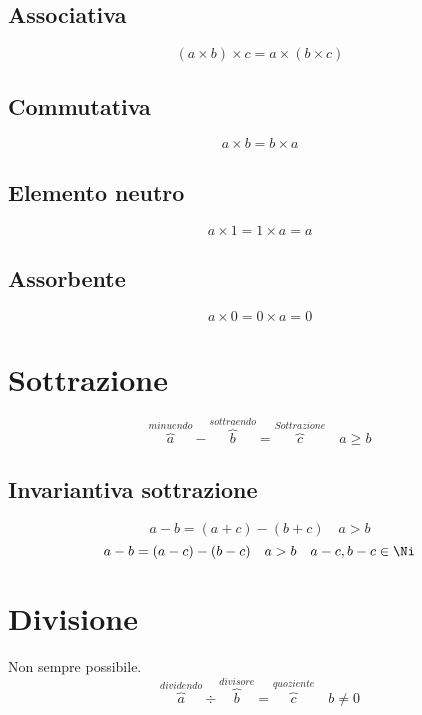 \subsection{Associativa}
\begin{equation}
(a\times b)\times c=a\times(b\times c) 
\end{equation}
\subsection{Commutativa}
\begin{equation}
a\times b=b\times a
\end{equation}
\subsection{Elemento neutro}
\begin{equation}
a\times 1=1\times a=a
\end{equation}
\subsection{Assorbente}
\begin{equation}
a\times 0=0\times a=0
\end{equation}
\section{Sottrazione}
\begin{equation}
\overbrace{a}^{minuendo}-\overbrace{b}^{sottraendo}=\overbrace{c}^{Sottrazione}\quad a\geq b
\end{equation}
\subsection{Invariantiva sottrazione}
\begin{equation}
a-b=(a+c)-(b+c)\quad a>b
\end{equation}
\begin{equation}
a-b=(a-c)-(b-c)\quad a>b\quad a-c,b-c\in\Ni
\end{equation}
 \section{Divisione}
 Non sempre possibile.
\begin{equation}
\overbrace{a}^{dividendo}\div\overbrace{b}^{divisore}=\overbrace{c}^{quoziente}\quad b\neq 0
\end{equation}
